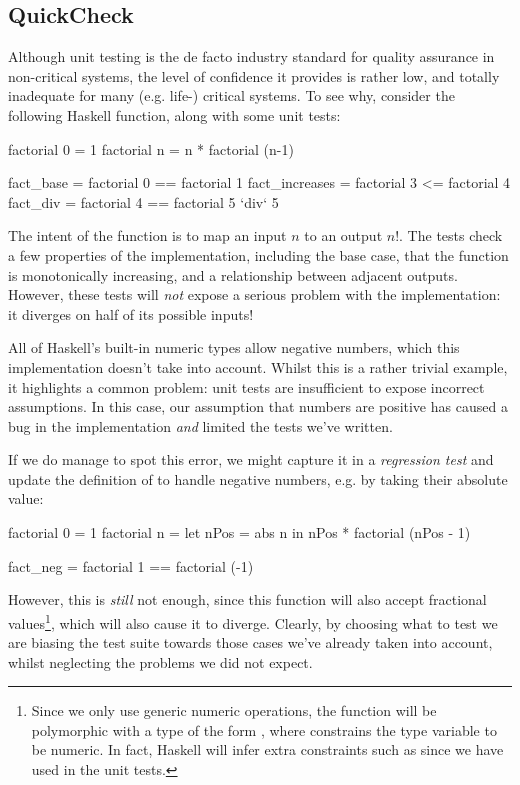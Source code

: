 \subsection{QuickCheck}
\label{sec:quickcheck}

Although unit testing is the de facto industry standard for quality assurance in
non-critical systems, the level of confidence it provides is rather low, and
totally inadequate for many (e.g. life-) critical systems. To see why, consider
the following Haskell function, along with some unit tests:

\begin{haskell}
  factorial 0 = 1
  factorial n = n * factorial (n-1)

  fact_base      = factorial 0 == factorial 1
  fact_increases = factorial 3 <= factorial 4
  fact_div       = factorial 4 == factorial 5 `div` 5
\end{haskell}

The intent of the function is to map an input $n$ to an output $n!$. The tests
check a few properties of the implementation, including the base case, that the
function is monotonically increasing, and a relationship between adjacent
outputs. However, these tests will \emph{not} expose a serious problem with the
implementation: it diverges on half of its possible inputs!

All of Haskell's built-in numeric types allow negative numbers, which this
implementation doesn't take into account. Whilst this is a rather trivial
example, it highlights a common problem: unit tests are insufficient to expose
incorrect assumptions. In this case, our assumption that numbers are positive
has caused a bug in the implementation \emph{and} limited the tests we've
written.

If we do manage to spot this error, we might capture it in a \emph{regression
  test} and update the definition of  to handle negative numbers,
e.g. by taking their absolute value:

\begin{haskell}
factorial 0 = 1
factorial n = let nPos = abs n
               in nPos * factorial (nPos - 1)

fact_neg = factorial 1 == factorial (-1)
\end{haskell}

However, this is \emph{still} not enough, since this function will also accept
fractional values\footnote{Since we only use generic numeric operations, the
  function will be polymorphic with a type of the form , where  constrains the type variable  to be
  numeric. In fact, Haskell will infer extra constraints such as  since
  we have used \hs{==} in the unit tests.}, which will also cause it to
diverge. Clearly, by choosing what to test we are biasing the test suite towards
those cases we've already taken into account, whilst neglecting the problems we
did not expect.

